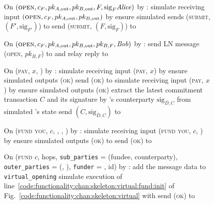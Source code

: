 \begin{figure}[H]
  \begin{simulatorbox}{\simulator}
    \begin{algorithmic}[1]
      \State On $(\textsc{open}, c_F, pk_{A, \mathrm{out}}, pk_{B,
      \mathrm{out}}, F, \mathrm{sig}_F \mathit{Alice})$ by \fchan: 
      \Indent
        \State simulate \alice receiving input $(\textsc{open}, c_F, pk_{A,
        \mathrm{out}}, pk_{B, \mathrm{out}})$ by \environment
        \State ensure simulated \alice sends (\textsc{submit}, $(F',
        \mathrm{sig}_{F'})$) to \ledger
        \State send (\textsc{submit}, $(F, \mathrm{sig}_F)$) to \ledger
      \EndIndent
      \Statex

      \State On $(\textsc{open}, c_F, pk_{A, \mathrm{out}}, pk_{B,
      \mathrm{out}}, pk_{B, F}, \mathit{Bob})$ by \fchan: 
      \Indent
        \State send LN message (\textsc{open}, $pk_{B, F}$) to \alice and relay
        reply to \fchan {}
      \EndIndent
      \Statex

      \State On (\textsc{pay}, $x$, \dave) by \fchan:
      \Indent
          \State simulate \dave receiving input (\textsc{pay}, $x$) by
          \environment
          \State ensure simulated \dave outputs (\textsc{ok})
          \State send (\textsc{ok}) to \fchan
         
          \State simulate \dave receiving input (\textsc{pay}, $x$) by
          \environment
          \State ensure simulated \dave outputs (\textsc{ok})
          \State extract the latest commitment transaction $C$ and its signature
          by \dave's counterparty $\mathrm{sig}_{\bar{D}, C}$ from simulated
          \dave's state
          \State send $(C, \mathrm{sig}_{\bar{D}, C})$ to \fchan
        \EndIf
      \EndIndent
      \Statex

      \State On (\textsc{fund you}, $c$, \bob, \charlie, \alice) by \fchan:
      \Indent
        \State simulate \alice receiving input (\textsc{fund you}, $c$, \bob) by
        \charlie
        \State ensure simulated \alice outputs (\textsc{ok}) to \charlie
        \State send (\textsc{ok}) to \fchan
      \EndIndent
      \Statex

      \State On (\textsc{fund} $c$, hops, \texttt{sub\_parties} = (fundee,
      counterparty), \texttt{outer\_parties} = (\charlie, \dave),
      \texttt{funder} = \alice, id) by \fchan:
      \label{code:simulator:fund}
      \Indent
        \State add the message data to \texttt{virtual\_opening}
        \State simulate execution of
        line~\ref{code:functionality:chan:skeleton:virtual:fund:init} of
        Fig.~\ref{code:functionality:chan:skeleton:virtual} with \alice
        \State send (\textsc{ok}) to \fchan
        \label{code:simulator:fund:ok}
      \EndIndent
      \Statex


\end{algorithmic}
\end{simulatorbox}
\end{figure}
